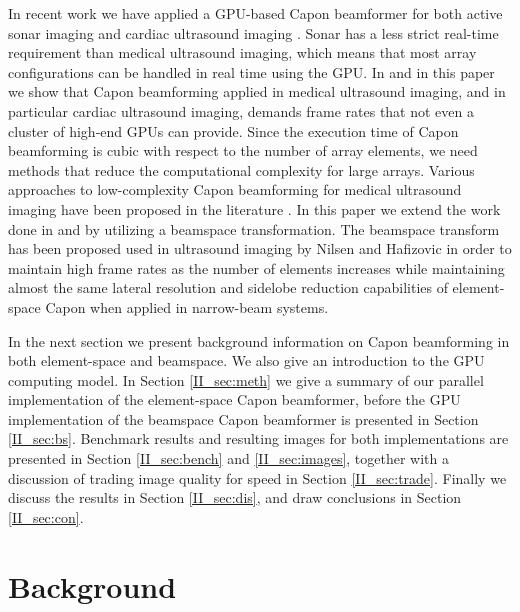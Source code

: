 In recent work we have applied a GPU-based Capon beamformer for both active sonar imaging \cite{Buskenes2015, Buskenes2013} and cardiac ultrasound imaging \cite{Asen2012}. Sonar has a less strict real-time requirement than medical ultrasound imaging, which means that most array configurations can be handled in real time using the GPU. In \cite{Asen2012} and in this paper we show that Capon beamforming applied in medical ultrasound imaging, and in particular cardiac ultrasound imaging, demands frame rates that not even a cluster of high-end GPUs can provide. Since the execution time of Capon beamforming is cubic with respect to the number of array elements, we need methods that reduce the computational complexity for large arrays. Various approaches to low-complexity Capon beamforming for medical ultrasound imaging have been proposed in the literature \cite{Synnevag2011, Asl2012, Jensen2012, Kim}. In this paper we extend the work done in \cite{Asen2012} and \cite{Buskenes2013} by utilizing a beamspace transformation. The beamspace transform has been proposed used in ultrasound imaging by Nilsen and Hafizovic \cite{Nilsen2009} in order to maintain high frame rates as the number of elements increases while maintaining almost the same lateral resolution and sidelobe reduction capabilities of element-space Capon when applied in narrow-beam systems.

In the next section we present background information on Capon beamforming in both element-space and beamspace. We also give an introduction to the GPU computing model. In Section \ref{II_sec:meth} we give a summary of our parallel implementation of the element-space Capon beamformer, before the GPU implementation of the beamspace Capon beamformer is presented in Section \ref{II_sec:bs}. Benchmark results and resulting images for both implementations are presented in Section \ref{II_sec:bench} and \ref{II_sec:images}, together with a discussion of trading image quality for speed in Section \ref{II_sec:trade}. Finally we discuss the results in Section \ref{II_sec:dis}, and draw conclusions in Section \ref{II_sec:con}. 

\section{Background}\label{II_background}

